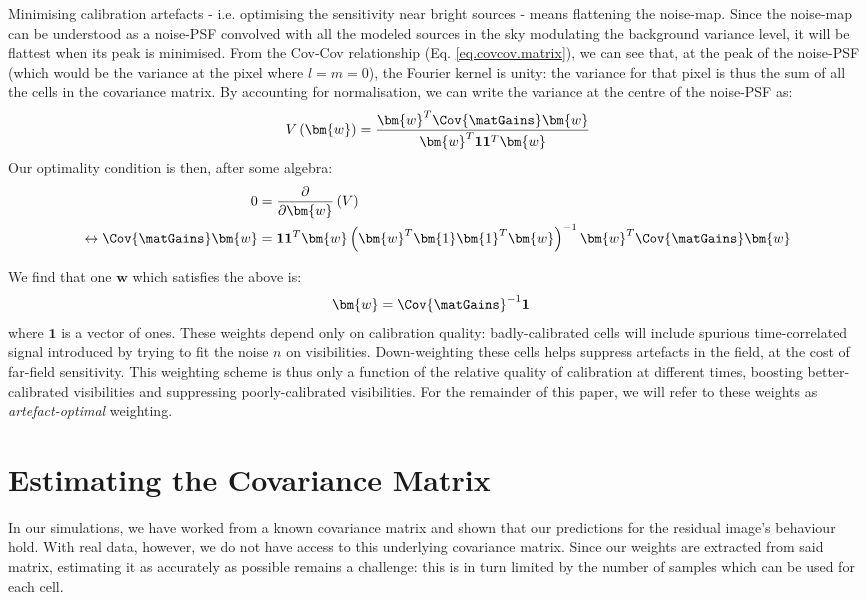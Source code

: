 \pg
Minimising calibration artefacts - i.e. optimising the sensitivity near bright sources - means flattening the noise-map. Since the noise-map can be understood as a noise-PSF convolved with all the modeled sources in the sky {modulating the background variance level,} it will be flattest when its peak is minimised. From the Cov-Cov relationship (Eq. \ref{eq.covcov.matrix}), we can see that, at the peak of the noise-PSF (which would be the variance at the pixel where $l=m=0$), the Fourier kernel is unity: the variance for that pixel is thus the sum of all the cells in the covariance matrix. By accounting for normalisation, we can write the variance at the centre of the noise-PSF as:
\begin{align}
V\left(\bm{w}\right) = \frac{\bm{w}^T {\Cov{\matGains}}\bm{w} }{\bm{w}^T \mathbf{1} \mathbf{1}^T \bm{w}}
\end{align}
Our optimality condition is then, after some algebra:
\begin{alignat}{2}
0 &=\frac{\partial}{\partial \bm{w}}\left( V \right)\\
\leftrightarrow
\Cov{\matGains} \bm{w} &= \mathbf{1}\mathbf{1}^T \bm{w} \left(\bm{w}^T \bm{1}\bm{1}^T\bm{w}\right)^{-1} \bm{w}^T\Cov{\matGains} \bm{w}
\end{alignat}


\pg
We find that one $\bm{w}$ which satisfies the above is:
\begin{align}
\bm{w} &= \Cov{\matGains}^{-1} \mathbf{1}\label{eq.fullweights.analytical}
\end{align}
where $\mathbf{1}$ is a vector of ones. These weights depend only on calibration quality: badly-calibrated cells will include spurious time-correlated signal introduced by trying to fit the noise $n$ on visibilities. Down-weighting these cells helps suppress artefacts in the field, at the cost of far-field sensitivity. This weighting scheme is thus only a function of the relative quality of calibration at different times, boosting better-calibrated visibilities and suppressing poorly-calibrated visibilities. For the remainder of this paper, we will refer to these weights as \emph{artefact-optimal} weighting.

\section{Estimating the Covariance Matrix}\label{section.algorithm}
\pg
In our simulations, we have worked from a known covariance matrix and shown that our predictions for the residual image's behaviour hold. With real data, however, we do not have access to this underlying covariance matrix. Since our weights are extracted from said matrix, estimating it as accurately as possible remains a challenge: this is in turn limited by the number of samples which can be used for each cell.

